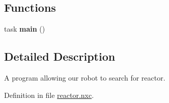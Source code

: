 \subsection*{Functions}
\begin{DoxyCompactItemize}
\item 
\hypertarget{reactor_8nxc_a9a2af8e2cd81255d3bf384db4a382807}{
task {\bfseries main} ()}
\label{reactor_8nxc_a9a2af8e2cd81255d3bf384db4a382807}

\end{DoxyCompactItemize}


\subsection{Detailed Description}
A program allowing our robot to search for reactor. 

Definition in file \hyperlink{reactor_8nxc_source}{reactor.nxc}.

